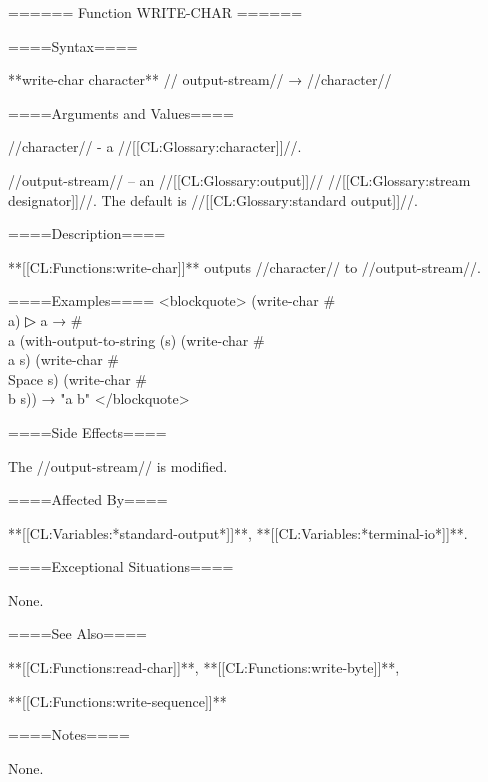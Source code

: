 ====== Function WRITE-CHAR ======

====Syntax====

**{write-char} {character** //\opt} output-stream// → //character//

====Arguments and Values====

//character// - a //[[CL:Glossary:character]]//.

//output-stream// -- an //[[CL:Glossary:output]]// //[[CL:Glossary:stream designator]]//. The default is //[[CL:Glossary:standard output]]//.

====Description====

**[[CL:Functions:write-char]]** outputs //character// to //output-stream//.

====Examples==== <blockquote> (write-char #\\a)
▷ a → #\\a (with-output-to-string (s) (write-char #\\a s) (write-char #\\Space s) (write-char #\\b s)) → "a b" </blockquote>

====Side Effects====

The //output-stream// is modified.

====Affected By====

**[[CL:Variables:*standard-output*]]**, **[[CL:Variables:*terminal-io*]]**.

====Exceptional Situations====

None.

====See Also====

**[[CL:Functions:read-char]]**, **[[CL:Functions:write-byte]]**,

**[[CL:Functions:write-sequence]]**

====Notes====

None.

